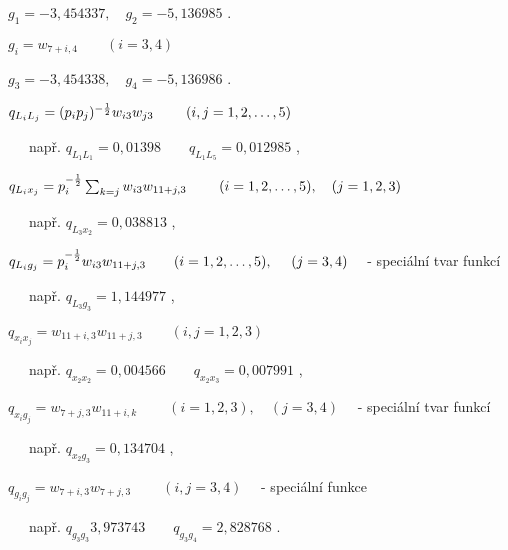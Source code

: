 \smallskip
 $g_1 = -3,454337, \quad g_2 = -5,136985$ .

%
$g_i = w_{7+i,4} \qquad (i=3,4)$

\smallskip
 $g_3 = -3,454338, \quad g_4 = -5,136986$ .



$q_{L_iL_j} = (p_ip_j)^{-{1\over2}}  w_{i3} w_{j3}\
\qquad (i,j=1,2,\ldots,5)$

\smallskip
~~~např. $q_{L_1L_1} = 0,01398 \qquad q_{L_1L_5} = 0,012985$ ,

\smallskip
$q_{L_ix_j} = p_i^{-{1\over2}}\sum_{k=j} w_{i3}w_{11+j,3}\
\qquad (i=1,2,\ldots,5), \quad (j=1,2,3)$

\smallskip
~~~např. $q_{L_3x_2} = 0,038813$ ,

\smallskip
$q_{L_ig_j}=p_i^{-{1\over2}} w_{i3}w_{11+j,3}\qquad(i=1,2,\ldots,5),\
\quad(j=3,4)\quad$ - speciální tvar funkcí

\smallskip
~~~např. $q_{L_3g_3} = 1,144977$ ,

\smallskip
$q_{x_ix_j} = w_{11+i,3} w_{11+j,3} \qquad (i,j=1,2,3)$

\smallskip
~~~např. $q_{x_2x_2} = 0,004566 \qquad q_{x_2x_3} = 0,007991$ ,

\smallskip
$q_{x_i g_j} = w_{7+j,3} w_{11+i,k} \qquad \
(i=1,2,3), \quad (j=3,4)\quad$ - speciální tvar funkcí

\smallskip
~~~např. $q_{x_2g_3} = 0,134704$ ,

\smallskip
$q_{g_ig_j} = w_{7+i,3} w_{7+j,3}\
\qquad (i,j=3,4)\quad$ - speciální funkce

\smallskip
~~~např. $q_{g_3g_3} 3,973743 \qquad q_{g_3g_4} = 2,828768$ .
